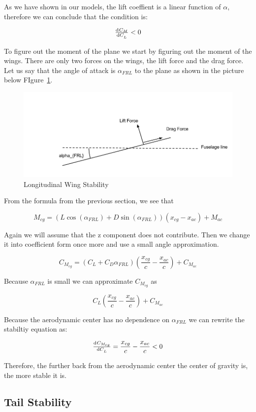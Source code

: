As we have shown in our models, the lift coeffient is a linear function of $\alpha$, therefore
we can conclude that the condition is:

\[\od{C_M}{C_L} < 0 \]

To figure out the moment of the plane we start by figuring out the moment of the wings.
There are only two forces on the wings, the lift force and the drag force. Let us say
that the angle of attack is $\alpha_{FRL}$ to the plane as shown in the picture below 
FIgure~\ref{fig:longitudinal_stability1}.

\begin{figure}[hl]
  \centering
    \includegraphics[scale=.5]{figures/longitudinal_stability1.png}
    \caption{Longitudinal Wing Stability}
  \label{fig:longitudinal_stability1}
\end{figure}

From the formula from the previous section, we see that 

\[M_{cg}  = (L\cos(\alpha_{FRL}) + D\sin(\alpha_{FRL}))(x_{cg} - x_{ac}) + M_{ac}\]

Again we will assume that the z component does not contribute. Then we change it into
coefficient form once more and use a small angle approximation.

\[ C_{M_{cg}} = (C_{L} + C_D \alpha_{FRL}) (\frac{x_{cg}}{c} - \frac{x_{ac}}{c}) + C_{M_{ac}} \]

Because $\alpha_{FRL}$ is small we can approximate $C_{M_{cg}}$ as

\[C_L (\frac{x_{cg}}{c} - \frac{x_{ac}}{c}) + C_{M_{ac}} \]

Because the aerodynamic center has no dependence on $\alpha_{FRL}$ we can rewrite the
stabiltiy equation as:

\[\od{C_{M_{cg}}}{C_L} = \frac{x_{cg}}{c} - \frac{x_{ac}}{c} < 0\]

Therefore, the further back from the aerodynamic center the center of gravity is, the
more stable it is.


\subsection{Tail Stability}
              

